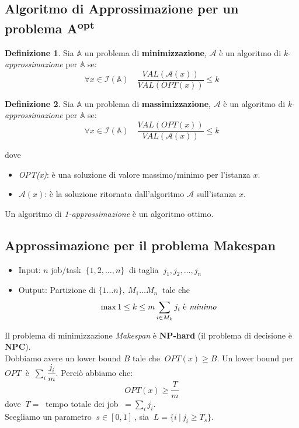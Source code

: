 \documentclass[a4paper]{article}
\theoremstyle{definition}
\newtheorem{definit}{Definizione}[subsection]
\newcommand{\np}{\mathbf{NP}}
\newcommand{\npc}{\mathbf{NPC}}
\newcommand{\prob}[1]{\mathbb{#1}}
\newcommand{\instance}[1]{\mathcal{I}(\prob{#1})}
\newcommand{\alg}[1]{\mathcal{#1}}
\begin{document}
		\subsection{Algoritmo di Approssimazione per un problema A\textsuperscript{opt}}
		\begin{definit}
			Sia $\mathbb{A}$ un problema di \textbf{minimizzazione}, $\mathcal{A}$ è un algoritmo di \textit{k-approssimazione} per $\mathbb{A}$ se: 
			\[
				\forall x \in \instance{A}\quad \dfrac{VAL(\alg{A}(x))}{VAL(OPT(x))}\leq k
			\]
			
		\end{definit}
	
	\begin{definit}
		Sia $\mathbb{A}$ un problema di \textbf{massimizzazione}, $\mathcal{A}$ è un algoritmo di \textit{k-approssimazione} per $\mathbb{A}$ se: 
		\[
			\forall x \in \instance{A}\quad \dfrac{VAL(OPT(x))}{VAL(\alg{A}(x))}\leq k
		\]

	\end{definit}

\noindent
dove
\begin{itemize}
	\item \textit{OPT(x)}: è una soluzione di valore massimo/minimo per l'istanza $x$.
	\item $\alg{A}(x)$: è la soluzione ritornata dall'algoritmo $\alg{A}$ sull'istanza $x$.
\end{itemize}
\noindent
Un algoritmo di \textit{1-approssimazione} è un algoritmo ottimo.
		
		\subsection{Approssimazione per il problema Makespan}
			\begin{itemize}
				\item Input: $ n $ job/task $ \ \{1, 2,\dots, n \} \ $ di taglia $ \ j_1, j_2,\dots, j_n $
				\item Output: Partizione di $ \{1 \dots n \},\ M_1 \dots M_n \ $ tale che
				\[
					\max\limits{1\leq k\leq m} \sum\limits_{i\in M_k} j_i \text{ è \textit{minimo}}
				\]
			\end{itemize}
		
		\noindent
		Il problema di minimizzazione \textit{Makespan} è $\np$\textbf{-hard} (il problema di decisione è $\npc$).\\
		
		Dobbiamo avere un lower bound $ B $ tale che $ \ OPT(x) \geq B $.		
		Un lower bound per $ OPT\ $ è $\ \sum\limits_{i} \dfrac{j_i}{m} $. Perciò abbiamo che:
		\[
			OPT(x) \geq \dfrac{T}{m}
		\]
		dove $\ T =\ $ tempo totale dei job $ \ = \sum\limits_{i} j_i $.\\
		Scegliamo un parametro $ \ s\in \left[ 0, 1 \right]\ $, sia $\ L = \{i\ |\ j_i \geq T_s \} $.\\
		
\end{document}

